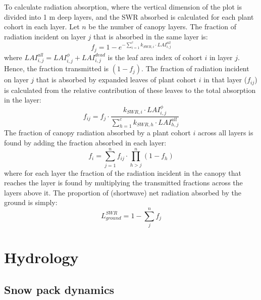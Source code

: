 \documentclass[]{book}
\begin{document}
To calculate radiation absorption, where the vertical dimension of the plot is
divided into 1 m deep layers, and the SWR absorbed is calculated for each plant
cohort in each layer. Let \(n\) be the number of canopy layers. The fraction of
radiation incident on layer \(j\) that is absorbed in the same layer is:
\begin{equation}
f_j=1 - e^{-\sum_{i=1}^{c}{k_{SWR,i} \cdot LAI_{i,j}^{all}}}
\end{equation}
where \(LAI_{i,j}^{all} = LAI_{i,j}^{\phi}+LAI_{i,j}^{dead}\) is the leaf area
index of cohort \(i\) in layer \(j\). Hence, the fraction transmitted is \((1-f_j)\).
The fraction of radiation incident on layer \(j\) that is absorbed by expanded leaves
of plant cohort \(i\) in that layer (\(f_{ij}\)) is calculated from the relative
contribution of these leaves to the total absorption in the layer:
\begin{equation}
f_{ij} = f_j \cdot \frac{k_{SWR,i}\cdot LAI_{i,j}^{\phi}}{\sum_{h=1}^{c}{k_{SWR,h} \cdot LAI_{h,j}^{all}}}
\end{equation}
The fraction of canopy radiation absorbed by a plant cohort \(i\) across all layers
is found by adding the fraction absorbed in each layer:
\begin{equation}
f_i = \sum_{j=1}^{n}{f_{ij}\cdot \prod_{h>j}^{n}{(1-f_h)}}
\end{equation}
where for each layer the fraction of the radiation incident in the canopy that
reaches the layer is found by multiplying the transmitted fractions across the
layers above it. The proportion of (shortwave) net radiation absorbed by the
ground is simply:
\begin{equation}
L^{SWR}_{ground} = 1 - \sum_{j}^{n}{f_j}
\end{equation}

\hypertarget{hydrology}{%
\chapter{Hydrology}\label{hydrology}}

\hypertarget{snowpack}{%
\section{Snow pack dynamics}\label{snowpack}}
\end{document}
